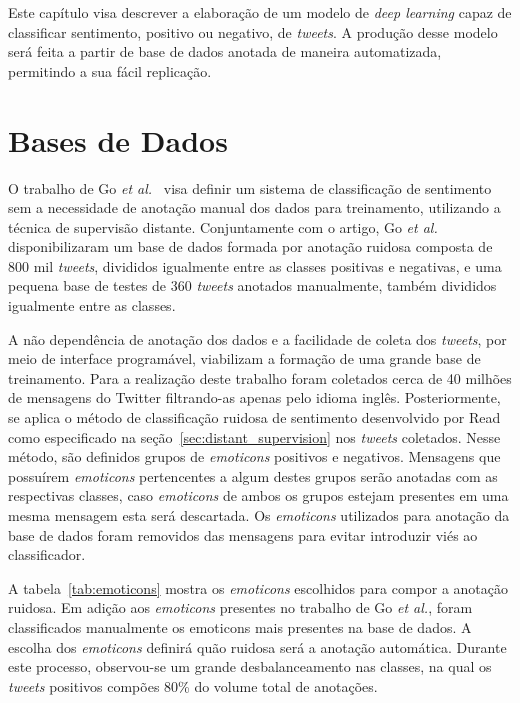 Este capítulo visa descrever a elaboração de um modelo de \textit{deep learning} capaz de classificar sentimento,
positivo ou negativo, de \textit{tweets}.
A produção desse modelo será feita a partir de base de dados anotada de maneira automatizada, permitindo a sua
fácil replicação.

\section{Bases de Dados} \label{sec:data}

O trabalho de Go \textit{et al.}~\cite{go09} visa definir um sistema de classificação de sentimento sem a necessidade de
anotação manual dos dados para treinamento, utilizando a técnica de supervisão distante.
Conjuntamente com o artigo, Go \textit{et al.} disponibilizaram um base de dados formada por anotação ruidosa composta
de 800 mil \textit{tweets}, divididos igualmente entre as classes positivas e negativas, e uma pequena base de testes de
360 \textit{tweets} anotados manualmente, também divididos igualmente entre as classes.

A não dependência de anotação dos dados e a facilidade de coleta dos \textit{tweets}, por meio de interface programável,
viabilizam a formação de uma grande base de treinamento.
Para a realização deste trabalho foram coletados cerca de 40 milhões de mensagens do Twitter filtrando-as apenas pelo
idioma inglês.
Posteriormente, se aplica o método de classificação ruidosa de sentimento desenvolvido por Read~\cite{read05} como
especificado na seção~\ref{sec:distant_supervision} nos \textit{tweets} coletados.
Nesse método, são definidos grupos de \textit{emoticons} positivos e negativos.
Mensagens que possuírem \textit{emoticons} pertencentes a algum destes grupos serão anotadas com as respectivas classes,
caso \textit{emoticons} de ambos os grupos estejam presentes em uma mesma mensagem esta será descartada.
Os \textit{emoticons} utilizados para anotação da base de dados foram removidos das mensagens para evitar introduzir
viés ao classificador.

A tabela~\ref{tab:emoticons} mostra os \textit{emoticons} escolhidos para compor a anotação ruidosa.
Em adição aos \textit{emoticons} presentes no trabalho de Go \textit{et al.}, foram classificados manualmente os
emoticons mais presentes na base de dados.
A escolha dos \textit{emoticons} definirá quão ruidosa será a anotação automática.
Durante este processo, observou-se um grande desbalanceamento nas classes, na qual os \textit{tweets} positivos
compões 80\% do volume total de anotações.


